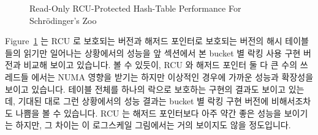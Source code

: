 \begin{figure}[tb]
\centering
{}
\caption{Read-Only RCU-Protected Hash-Table Performance For Schr\"odinger's Zoo}
\label{fig:datastruct:Read-Only RCU-Protected Hash-Table Performance For Schroedinger's Zoo}
\end{figure}

Figure~\ref{fig:datastruct:Read-Only RCU-Protected Hash-Table Performance For Schroedinger's Zoo}
는 RCU 로 보호되는 버전과 해저드 포인터로 보호되는 버전의 해시 테이블들의
읽기만 일어나는 상황에서의 성능을 앞 섹션에서 본 bucket 별 락킹 사용 구현
버전과 비교해 보이고 있습니다.
볼 수 있듯이, RCU 와 해저드 포인터 둘 다 큰 수의 쓰레드들 에서는 NUMA 영향을
받기는 하지만 이상적인 경우에 가까운 성능과 확장성을 보이고 있습니다.
테이블 전체를 하나의 락으로 보호하는 구현의 결과도 보이고 있는데, 기대된 대로
그런 상황에서의 성능 결과는 bucket 별 락킹 구현 버전에 비해서조차도 나쁨을 볼
수 있습니다.
RCU 는 해저드 포인터보다 아주 약간 좋은 성능을 보이기는 하지만, 그 차이는 이
로그스케일 그림에서는 거의 보이지도 않을 정도입니다.

